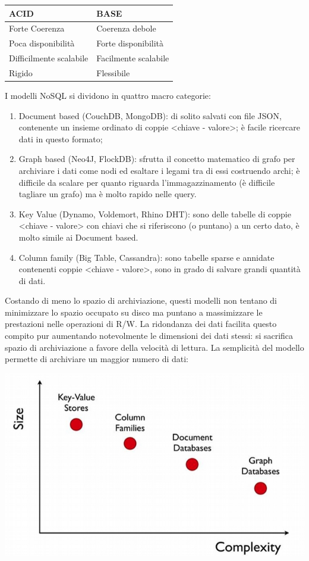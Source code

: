 \documentclass[a4page, 11pt]{article}
\begin{document}
\begin{center}
\begin{tabular}{l|l}
ACID & BASE \\
\hline
Forte Coerenza & Coerenza debole \\
Poca disponibilità & Forte disponibilità \\
Difficilmente scalabile & Facilmente scalabile\\
Rigido & Flessibile \\
\end{tabular}
\end{center}

I modelli NoSQL si dividono in quattro macro categorie\cite{NoSQLDB, GraphDB}:
\begin{enumerate}[noitemsep]
\item Document based (CouchDB, MongoDB): di solito salvati con file JSON, contenente un insieme ordinato di coppie \textless{}chiave - valore\textgreater{}; è facile ricercare dati in questo formato;
\item Graph based (Neo4J, FlockDB): sfrutta il concetto matematico di grafo per archiviare i dati come nodi ed esaltare i legami tra di essi costruendo archi; è difficile da scalare per quanto riguarda l'immagazzinamento (è difficile tagliare un grafo) ma è molto rapido nelle query.
\item Key Value (Dynamo, Voldemort, Rhino DHT): sono delle tabelle di coppie \textless{}chiave - valore\textgreater{} con chiavi che si riferiscono (o puntano) a un certo dato, è molto simile ai Document based.
\item Column family (Big Table, Cassandra): sono tabelle sparse e annidate contenenti coppie \textless{}chiave - valore\textgreater{}, sono in grado di salvare grandi quantità di dati.
\end{enumerate}

Costando di meno lo spazio di archiviazione, questi modelli non tentano di minimizzare lo spazio occupato su disco ma puntano a massimizzare le prestazioni nelle operazioni di R/W.
La ridondanza dei dati facilita questo compito pur aumentando notevolmente le dimensioni dei dati stessi: si sacrifica spazio di archiviazione a favore della velocità di lettura.
La semplicità del modello permette di archiviare un maggior numero di dati:
\begin{center}
	\includegraphics[scale=0.4]{IMAGE1.jpg}
\end{center}
\end{document}
